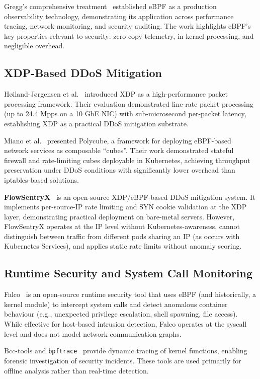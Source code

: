 Gregg's comprehensive treatment~\cite{gregg2019bpf} established eBPF as a production
observability technology, demonstrating its application across performance tracing,
network monitoring, and security auditing. The work highlights eBPF's key properties
relevant to security: zero-copy telemetry, in-kernel processing, and negligible overhead.

\subsection{XDP-Based DDoS Mitigation}

H\o{}iland-J\o{}rgensen et al.~\cite{hoiland2018xdp} introduced XDP as a high-performance
packet processing framework. Their evaluation demonstrated line-rate packet processing
(up to 24.4 Mpps on a 10 GbE NIC) with sub-microsecond per-packet latency, establishing
XDP as a practical DDoS mitigation substrate.

Miano et al.~\cite{miano2019polycube} presented Polycube, a framework for deploying
eBPF-based network services as composable ``cubes''. Their work demonstrated stateful
firewall and rate-limiting cubes deployable in Kubernetes, achieving throughput
preservation under DDoS conditions with significantly lower overhead than iptables-based
solutions.

\textbf{FlowSentryX}~\cite{flowsentryx} is an open-source XDP/eBPF-based DDoS mitigation
system. It implements per-source-IP rate limiting and SYN cookie validation at the XDP
layer, demonstrating practical deployment on bare-metal servers. However, FlowSentryX
operates at the IP level without Kubernetes-awareness, cannot distinguish between traffic
from different pods sharing an IP (as occurs with Kubernetes Services), and applies static
rate limits without anomaly scoring.

\subsection{Runtime Security and System Call Monitoring}

Falco~\cite{falco2023} is an open-source runtime security tool that uses eBPF (and
historically, a kernel module) to intercept system calls and detect anomalous container
behaviour (e.g., unexpected privilege escalation, shell spawning, file access). While
effective for host-based intrusion detection, Falco operates at the syscall level and does
not model network communication graphs.

Bcc-tools and \texttt{bpftrace}~\cite{bpftrace} provide dynamic tracing of kernel
functions, enabling forensic investigation of security incidents. These tools are used
primarily for offline analysis rather than real-time detection.

